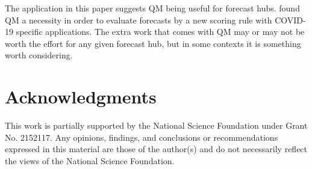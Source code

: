 The application in this paper suggests QM being useful for forecast hubs.  
\cite{gerding2023evaluating} found QM a necessity in order to evaluate 
forecasts by a new scoring rule with COVID-19 specific applications. The extra 
work that comes with QM may or may not be worth the effort for any given 
forecast hub, but in some contexts it is something worth considering.


\section{Acknowledgments}
This work is partially supported by the National Science Foundation under 
Grant No. 2152117. Any opinions, findings, and conclusions or recommendations 
expressed in this material are those of the author(s) and do not necessarily 
reflect the views of the National Science Foundation.

\appendix



% 




% 
% 
% 
